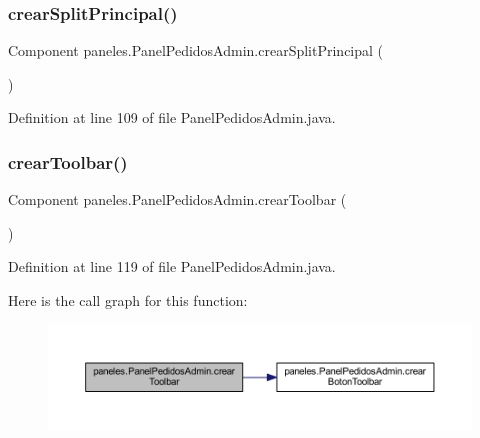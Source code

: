 \subsubsection{\texorpdfstring{crear\+Split\+Principal()}{crearSplitPrincipal()}}
{\footnotesize\ttfamily Component paneles.\+Panel\+Pedidos\+Admin.\+crear\+Split\+Principal (\begin{DoxyParamCaption}{ }\end{DoxyParamCaption})}



Definition at line 109 of file Panel\+Pedidos\+Admin.\+java.

\mbox{\label{classpaneles_1_1_panel_pedidos_admin_a3479b5a4aa009da3d3e99ad6ad689a57}} 
\subsubsection{\texorpdfstring{crear\+Toolbar()}{crearToolbar()}}
{\footnotesize\ttfamily Component paneles.\+Panel\+Pedidos\+Admin.\+crear\+Toolbar (\begin{DoxyParamCaption}{ }\end{DoxyParamCaption})}



Definition at line 119 of file Panel\+Pedidos\+Admin.\+java.

Here is the call graph for this function\+:\nopagebreak
\begin{figure}[H]
\begin{center}
\leavevmode
\includegraphics[width=350pt]{classpaneles_1_1_panel_pedidos_admin_a3479b5a4aa009da3d3e99ad6ad689a57_cgraph}
\end{center}
\end{figure}
\mbox{\label{classpaneles_1_1_panel_pedidos_admin_a76287d5b003f15b41fd889936a6e817e}} 
